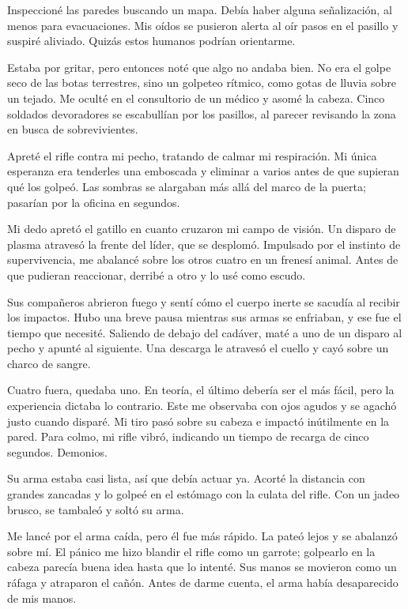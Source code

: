 Inspeccioné las paredes buscando un mapa. Debía haber alguna señalización, al menos para evacuaciones. Mis oídos se pusieron alerta al oír pasos en el pasillo y suspiré aliviado. Quizás estos humanos podrían orientarme.

Estaba por gritar, pero entonces noté que algo no andaba bien. No era el golpe seco de las botas terrestres, sino un golpeteo rítmico, como gotas de lluvia sobre un tejado. Me oculté en el consultorio de un médico y asomé la cabeza. Cinco soldados devoradores se escabullían por los pasillos, al parecer revisando la zona en busca de sobrevivientes.

Apreté el rifle contra mi pecho, tratando de calmar mi respiración. Mi única esperanza era tenderles una emboscada y eliminar a varios antes de que supieran qué los golpeó. Las sombras se alargaban más allá del marco de la puerta; pasarían por la oficina en segundos.

Mi dedo apretó el gatillo en cuanto cruzaron mi campo de visión. Un disparo de plasma atravesó la frente del líder, que se desplomó. Impulsado por el instinto de supervivencia, me abalancé sobre los otros cuatro en un frenesí animal. Antes de que pudieran reaccionar, derribé a otro y lo usé como escudo.

Sus compañeros abrieron fuego y sentí cómo el cuerpo inerte se sacudía al recibir los impactos. Hubo una breve pausa mientras sus armas se enfriaban, y ese fue el tiempo que necesité. Saliendo de debajo del cadáver, maté a uno de un disparo al pecho y apunté al siguiente. Una descarga le atravesó el cuello y cayó sobre un charco de sangre.

Cuatro fuera, quedaba uno. En teoría, el último debería ser el más fácil, pero la experiencia dictaba lo contrario. Este me observaba con ojos agudos y se agachó justo cuando disparé. Mi tiro pasó sobre su cabeza e impactó inútilmente en la pared. Para colmo, mi rifle vibró, indicando un tiempo de recarga de cinco segundos. Demonios.

Su arma estaba casi lista, así que debía actuar ya. Acorté la distancia con grandes zancadas y lo golpeé en el estómago con la culata del rifle. Con un jadeo brusco, se tambaleó y soltó su arma.

Me lancé por el arma caída, pero él fue más rápido. La pateó lejos y se abalanzó sobre mí. El pánico me hizo blandir el rifle como un garrote; golpearlo en la cabeza parecía buena idea hasta que lo intenté. Sus manos se movieron como un ráfaga y atraparon el cañón. Antes de darme cuenta, el arma había desaparecido de mis manos.


